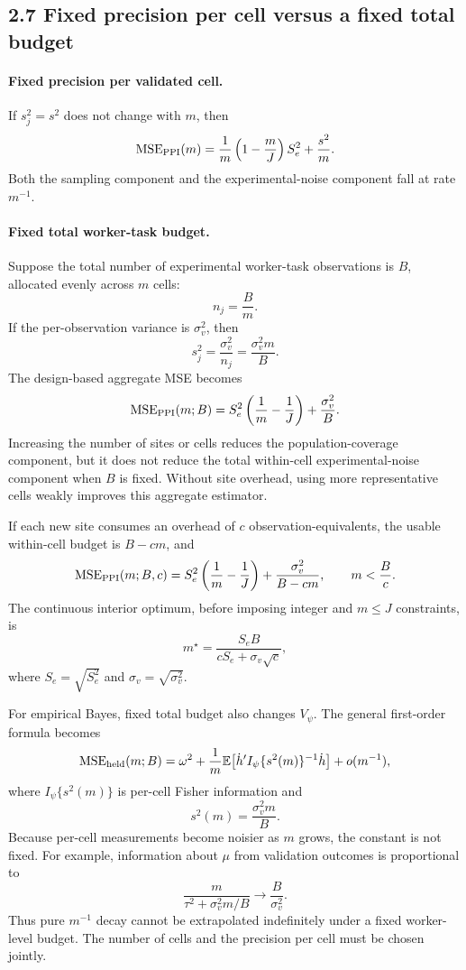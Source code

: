 \documentclass[11pt]{article}
\newcommand{\E}{\mathbb{E}}
\newcommand{\MSE}{\operatorname{MSE}}
\begin{document}
\subsection*{2.7 Fixed precision per cell versus a fixed total budget}

\paragraph{Fixed precision per validated cell.}
If \(s_j^2=s^2\) does not change with \(m\), then
\[
    \MSE_{\rm PPI}(m)
    =
    \frac1m\left(1-\frac mJ\right)S_e^2+\frac{s^2}{m}.
\]
Both the sampling component and the experimental-noise component fall at rate
\(m^{-1}\).

\paragraph{Fixed total worker-task budget.}
Suppose the total number of experimental worker-task observations is \(B\),
allocated evenly across \(m\) cells:
\[
    n_j=\frac Bm.
\]
If the per-observation variance is \(\sigma_v^2\), then
\[
    s_j^2
    =
    \frac{\sigma_v^2}{n_j}
    =
    \frac{\sigma_v^2m}{B}.
\]
The design-based aggregate MSE becomes
\[
    \MSE_{\rm PPI}(m;B)
    =
    S_e^2\left(\frac1m-\frac1J\right)
    +
    \frac{\sigma_v^2}{B}.
\]
Increasing the number of sites or cells reduces the population-coverage
component, but it does not reduce the total within-cell experimental-noise
component when \(B\) is fixed. Without site overhead, using more representative
cells weakly improves this aggregate estimator.

If each new site consumes an overhead of \(c\) observation-equivalents, the
usable within-cell budget is \(B-cm\), and
\[
    \MSE_{\rm PPI}(m;B,c)
    =
    S_e^2\left(\frac1m-\frac1J\right)
    +
    \frac{\sigma_v^2}{B-cm},
    \qquad
    m<\frac Bc.
\]
The continuous interior optimum, before imposing integer and \(m\leq J\)
constraints, is
\[
    m^\star
    =
    \frac{S_eB}{cS_e+\sigma_v\sqrt c},
\]
where \(S_e=\sqrt{S_e^2}\) and
\(\sigma_v=\sqrt{\sigma_v^2}\).

For empirical Bayes, fixed total budget also changes \(V_\psi\). The general
first-order formula becomes
\[
    \MSE_{\rm held}(m;B)
    =
    \omega^2
    +
    \frac1m
    \E\!\left[
       \dot h'
       I_\psi\{s^2(m)\}^{-1}
       \dot h
    \right]
    +
    o(m^{-1}),
\]
where \(I_\psi\{s^2(m)\}\) is per-cell Fisher information and
\[
    s^2(m)=\frac{\sigma_v^2m}{B}.
\]
Because per-cell measurements become noisier as \(m\) grows, the constant is
not fixed. For example, information about \(\mu\) from validation outcomes is
proportional to
\[
    \frac{m}{\tau^2+\sigma_v^2m/B}
    \longrightarrow
    \frac{B}{\sigma_v^2}.
\]
Thus pure \(m^{-1}\) decay cannot be extrapolated indefinitely under a fixed
worker-level budget. The number of cells and the precision per cell must be
chosen jointly.
\end{document}
